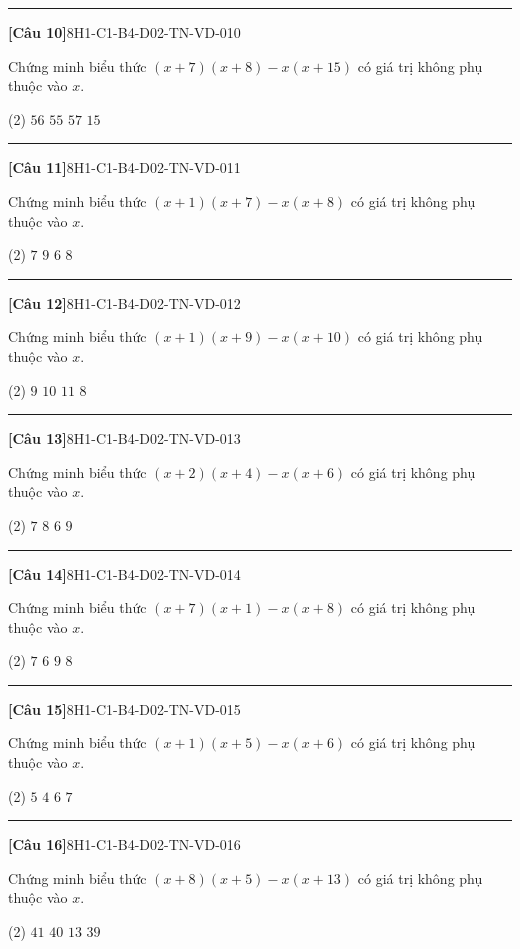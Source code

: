 \documentclass[12pt,a4paper]{article}
\newif\ifloigiai
\newenvironment{cauhoi}[2]{%
  \par\medskip\noindent\rule{\textwidth}{0.4pt}\par\nopagebreak
  \noindent\textbf{[#1]}\hfill{\scriptsize\ttfamily #2}\par\nopagebreak\smallskip}{\par}
\newcommand{\dapan}[1]{\ifloigiai\par\smallskip\noindent\textit{Đáp án:} \textbf{#1}\par\fi}
\begin{document}
\begin{cauhoi}{Câu 10}{8H1-C1-B4-D02-TN-VD-010}
Chứng minh biểu thức $(x+7)(x+8)-x(x+15)$ có giá trị không phụ thuộc vào $x$.
\begin{tasks}(2)
\task $56$
\task $55$
\task $57$
\task $15$
\end{tasks}
\dapan{A}
\end{cauhoi}
\begin{cauhoi}{Câu 11}{8H1-C1-B4-D02-TN-VD-011}
Chứng minh biểu thức $(x+1)(x+7)-x(x+8)$ có giá trị không phụ thuộc vào $x$.
\begin{tasks}(2)
\task $7$
\task $9$
\task $6$
\task $8$
\end{tasks}
\dapan{A}
\end{cauhoi}
\begin{cauhoi}{Câu 12}{8H1-C1-B4-D02-TN-VD-012}
Chứng minh biểu thức $(x+1)(x+9)-x(x+10)$ có giá trị không phụ thuộc vào $x$.
\begin{tasks}(2)
\task $9$
\task $10$
\task $11$
\task $8$
\end{tasks}
\dapan{A}
\end{cauhoi}
\begin{cauhoi}{Câu 13}{8H1-C1-B4-D02-TN-VD-013}
Chứng minh biểu thức $(x+2)(x+4)-x(x+6)$ có giá trị không phụ thuộc vào $x$.
\begin{tasks}(2)
\task $7$
\task $8$
\task $6$
\task $9$
\end{tasks}
\dapan{B}
\end{cauhoi}
\begin{cauhoi}{Câu 14}{8H1-C1-B4-D02-TN-VD-014}
Chứng minh biểu thức $(x+7)(x+1)-x(x+8)$ có giá trị không phụ thuộc vào $x$.
\begin{tasks}(2)
\task $7$
\task $6$
\task $9$
\task $8$
\end{tasks}
\dapan{A}
\end{cauhoi}
\begin{cauhoi}{Câu 15}{8H1-C1-B4-D02-TN-VD-015}
Chứng minh biểu thức $(x+1)(x+5)-x(x+6)$ có giá trị không phụ thuộc vào $x$.
\begin{tasks}(2)
\task $5$
\task $4$
\task $6$
\task $7$
\end{tasks}
\dapan{A}
\end{cauhoi}
\begin{cauhoi}{Câu 16}{8H1-C1-B4-D02-TN-VD-016}
Chứng minh biểu thức $(x+8)(x+5)-x(x+13)$ có giá trị không phụ thuộc vào $x$.
\begin{tasks}(2)
\task $41$
\task $40$
\task $13$
\task $39$
\end{tasks}
\dapan{B}
\end{cauhoi}
\end{document}
